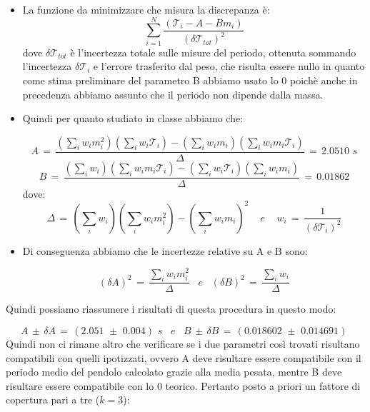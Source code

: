 \begin{itemize}
	\item{La funzione da minimizzare che misura la discrepanza è:
			\begin{equation}
                \sum_{i=1}^{N} \frac{(\mathcal{T}_i - A - B m_i)}{(\delta \mathcal{T}_{tot})^2}	
                \label{eq:min_quad}
			\end{equation}
            dove $\delta \mathcal{T}_{tot}$ è l'incertezza totale sulle misure del periodo, ottenuta sommando l'incertezza $\delta \mathcal{T}_i$ e l'errore trasferito dal peso, che risulta essere nullo in quanto come stima preliminare del parametro B abbiamo usato lo 0 poichè anche in precedenza abbiamo assunto che il periodo non dipende dalla massa.}
	\item{Quindi per quanto studiato in classe abbiamo che:

			\begin{equation*}
				A \,=\, \frac{(\sum_i w_i m_i^2)(\sum_i w_i \mathcal{T}_i) - (\sum_i w_i m_i)(\sum_i w_i m_i \mathcal{T}_i)}{\Delta} \,=\, 2.0510 \,\, s
			\end{equation*}
			\begin{equation*}
				B \,=\, \frac{(\sum_i w_i)(\sum_i w_i m_i \mathcal{T}_i) - (\sum_i w_i \mathcal{T}_i)(\sum_i w_i m_i)}{\Delta} \,=\, 0.01862
			\end{equation*}
			dove:
			\begin{equation*}
				\Delta \,=\, (\sum_i w_i)(\sum_i w_i m_i^2) - (\sum_i w_i m_i)^2 \,\,\,\,\,\,\, e \,\,\,\,\,\,\,
				w_i \,=\, \frac{1}{(\delta \mathcal{T}_i)^2}
			\end{equation*}}
	\item{Di conseguenza abbiamo che le incertezze relative su A e B sono:

			\begin{equation*}
				(\delta A)^2 \,=\, \frac{\sum_i w_i m_i^2}{\Delta}  \,\,\,\,\, e \,\,\,\,\,
				(\delta B)^2 \,=\, \frac{\sum_i w_i}{\Delta} 
			\end{equation*}}
	\end{itemize} 
	Quindi possiamo riassumere i risultati di questa procedura in questo modo:

	\begin{equation*}
		A \,\pm\, \delta A \,=\, (2.051 \,\, \pm \,\, 0.004) \,\,s \,\,\,\,\, e \,\,\,\,\,
		B \,\pm\, \delta B \,=\, (0.018602 \,\, \pm \,\, 0.014691) \,\,
	\end{equation*}
Quindi non ci rimane altro che verificare se i due parametri così trovati risultano compatibili con quelli ipotizzati, ovvero A deve risultare essere compatibile con il periodo medio del pendolo calcolato grazie alla media pesata, mentre B deve risultare essere compatibile con lo 0 teorico. Pertanto posto a priori un fattore di copertura pari a tre ($k = 3$):

